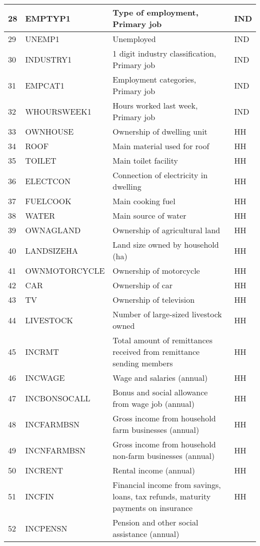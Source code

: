 \documentclass[letterpaper,10pt,english]{sphinxmanual}
\begin{document}
\begin{savenotes}
\begin{longtable}[c]{|l|l|l|l|}
\hline
28
&
EMPTYP1
&
Type of
employment,
Primary job
&
IND
\\
\hline
29
&
UNEMP1
&
Unemployed
&
IND
\\
\hline
30
&
INDUSTRY1
&
1 digit
industry
classification,
Primary job
&
IND
\\
\hline
31
&
EMPCAT1
&
Employment
categories,
Primary job
&
IND
\\
\hline
32
&
WHOURSWEEK1
&
Hours worked
last week,
Primary job
&
IND
\\
\hline
33
&
OWNHOUSE
&
Ownership of
dwelling unit
&
HH
\\
\hline
34
&
ROOF
&
Main material
used for roof
&
HH
\\
\hline
35
&
TOILET
&
Main toilet
facility
&
HH
\\
\hline
36
&
ELECTCON
&
Connection of
electricity in
dwelling
&
HH
\\
\hline
37
&
FUELCOOK
&
Main cooking
fuel
&
HH
\\
\hline
38
&
WATER
&
Main source of
water
&
HH
\\
\hline
39
&
OWNAGLAND
&
Ownership of
agricultural
land
&
HH
\\
\hline
40
&
LANDSIZEHA
&
Land size owned
by household
(ha)
&
HH
\\
\hline
41
&
OWNMOTORCYCLE
&
Ownership of
motorcycle
&
HH
\\
\hline
42
&
CAR
&
Ownership of
car
&
HH
\\
\hline
43
&
TV
&
Ownership of
television
&
HH
\\
\hline
44
&
LIVESTOCK
&
Number of
large-sized
livestock owned
&
HH
\\
\hline
45
&
INCRMT
&
Total amount of
remittances
received from
remittance
sending members
&
HH
\\
\hline
46
&
INCWAGE
&
Wage and
salaries (annual)
&
HH
\\
\hline
47
&
INCBONSOCALL
&
Bonus and
social
allowance from
wage
job (annual)
&
HH
\\
\hline
48
&
INCFARMBSN
&
Gross income
from household
farm
businesses (annual)
&
HH
\\
\hline
49
&
INCNFARMBSN
&
Gross income
from household
non-farm
businesses (annual)
&
HH
\\
\hline
50
&
INCRENT
&
Rental
income (annual)
&
HH
\\
\hline
51
&
INCFIN
&
Financial
income from
savings, loans,
tax refunds,
maturity
payments on
insurance
&
HH
\\
\hline
52
&
INCPENSN
&
Pension and
other social
assistance (annual)

\end{longtable}
\end{savenotes}
\end{document}
